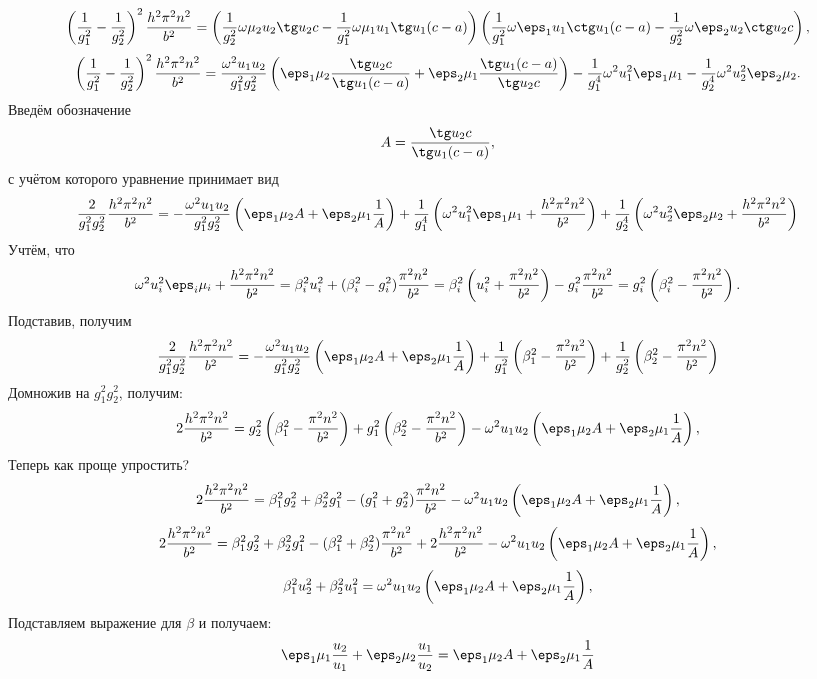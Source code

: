 \documentclass[12pt]{hedsemwork}
\renewcommand{\frac}{\dfrac}
\begin{document}
\[
    \left( \frac{1}{g_1^2} - \frac{1}{g_2^2} \right)^2\frac{h^2\pi^2n^2}{b^2}=
    \left(\frac{1}{g_2^2}\omega\mu_2u_2\tg u_2 c-
    \frac{1}{g_1^2}\omega\mu_1u_1\tg u_1 (c-a)\right)
    \left(\frac{1}{g_1^2}\omega\eps_1u_1\ctg u_1 (c-a)-
    \frac{1}{g_2^2}\omega\eps_2u_2\ctg u_2 c\right),
\]
\[
    \left( \frac{1}{g_1^2} - \frac{1}{g_2^2} \right)^2\frac{h^2\pi^2n^2}{b^2}=
    \frac{\omega^2u_1u_2}{g_1^2g_2^2}\left(\eps_1\mu_2\frac{\tg u_2 c}{\tg u_1
    (c-a)} + \eps_2\mu_1\frac{\tg u_1 (c-a)}{\tg u_2 c}\right) -\frac{1}{g_1^4}
    \omega^2u_1^2\eps_1\mu_1 - \frac{1}{g_2^4}\omega^2u_2^2\eps_2\mu_2.
\]
Введём обозначение
\[
    A = \frac{\tg u_2 c}{\tg u_1 (c-a)},
\]
с учётом которого уравнение принимает вид
\[
    \frac{2}{g_1^2 g_2^2}\frac{h^2\pi^2n^2}{b^2} =
    -\frac{\omega^2u_1u_2}{g_1^2g_2^2}\left(\eps_1\mu_2 A +
    \eps_2\mu_1\frac{1}{A}\right) +
    \frac{1}{g_1^4}
    \left(\omega^2u_1^2\eps_1\mu_1 + \frac{h^2\pi^2n^2}{b^2}\right) +
    \frac{1}{g_2^4}
    \left(\omega^2u_2^2\eps_2\mu_2 + \frac{h^2\pi^2n^2}{b^2}\right)
\]
Учтём, что
\[
    \omega^2u_i^2\eps_i\mu_i + \frac{h^2\pi^2n^2}{b^2} = \beta_i^2u_i^2 +
    (\beta_i^2 - g_i^2)\frac{\pi^2n^2}{b^2} =
    \beta_i^2\left( u_i^2 + \frac{\pi^2n^2}{b^2} \right) -
    g_i^2\frac{\pi^2n^2}{b^2} =
    g_i^2\left( \beta_i^2 - \frac{\pi^2n^2}{b^2}\right).
\]
Подставив, получим
\[
    \frac{2}{g_1^2 g_2^2}\frac{h^2\pi^2n^2}{b^2} =
    -\frac{\omega^2u_1u_2}{g_1^2g_2^2}\left(\eps_1\mu_2 A +
    \eps_2\mu_1\frac{1}{A}\right) +
    \frac{1}{g_1^2}
    \left(\beta_1^2 - \frac{\pi^2n^2}{b^2}\right) +
    \frac{1}{g_2^2}
    \left(\beta_2^2 - \frac{\pi^2n^2}{b^2}\right)
\]
Домножив на \( g_1^2g_2^2 \), получим:
\[
    2\frac{h^2\pi^2n^2}{b^2} = g_2^2
    \left(\beta_1^2 - \frac{\pi^2n^2}{b^2}\right) +
    g_1^2\left(\beta_2^2 - \frac{\pi^2n^2}{b^2}\right)-
    \omega^2u_1u_2\left(\eps_1\mu_2 A +
    \eps_2\mu_1\frac{1}{A}\right),
\]
Теперь как проще упростить?
\[
    2\frac{h^2\pi^2n^2}{b^2} =
    \beta_1^2 g_2^2 + \beta_2^2 g_1^2 -
    (g_1^2+g_2^2)\frac{\pi^2n^2}{b^2} -
    \omega^2u_1u_2\left(\eps_1\mu_2 A +
    \eps_2\mu_1\frac{1}{A}\right),
\]
\[
    2\frac{h^2\pi^2n^2}{b^2} =
    \beta_1^2 g_2^2 + \beta_2^2 g_1^2 -
    (\beta_1^2+\beta_2^2)\frac{\pi^2n^2}{b^2} +
    2\frac{h^2\pi^2n^2}{b^2} -
    \omega^2u_1u_2\left(\eps_1\mu_2 A +
    \eps_2\mu_1\frac{1}{A}\right),
\]
\[
    \beta_1^2u_2^2 + \beta_2^2u_1^2=
    \omega^2u_1u_2\left(\eps_1\mu_2 A +
    \eps_2\mu_1\frac{1}{A}\right),
\]
Подставляем выражение для \( \beta \) и получаем:
\[
    \eps_1\mu_1\frac{u_2}{u_1} + \eps_2\mu_2\frac{u_1}{u_2} =
    \eps_1\mu_2 A + \eps_2\mu_1\frac{1}{A}
\]
\end{document}
